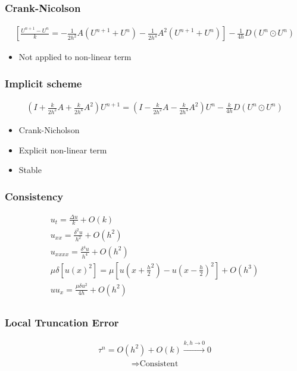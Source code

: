 \documentclass[screen]{beamer}
\begin{document}
\begin{frame}
\frametitle{Crank-Nicolson}
\small
\begin{align*}
 \left[\frac{U^{n+1} - U^n}{k} =
- \frac{1}{2h^2}A(U^{n+1}+U^n) - \frac{1}{2h^4}A^2(U^{n+1}+U^n) \right] - \frac{1}{4h}D(U^{n}\odot U^n)
\end{align*}
\begin{itemize}
\normalsize
\item Not applied to non-linear term
\end{itemize}
\end{frame}


\begin{frame}
\frametitle{Implicit scheme}
\begin{align*}
(I + \frac{k}{2h^2}A + \frac{k}{2h^4}A^2)U^{n+1}
= (I - \frac{k}{2h^2}A - \frac{k}{2h^4}A^2)U^n - \frac{k}{4h}D(U^{n}\odot U^n)
\end{align*}

\begin{itemize}
\item Crank-Nicholson
\item Explicit non-linear term
\item Stable
\end{itemize}

\end{frame}

\begin{frame}
\frametitle{Consistency}
\begin{align*}
u_t= \frac{\Delta u}{k} + O(k) \\
u_{xx} = \frac{\delta^2 u}{h^2} + O(h^2) \\
u_{xxxx} = \frac{\delta^4 u}{h^4} + O(h^2) \\
\mu \delta \left[u(x)^2\right] = \mu\left[u(x+\frac{h}{2}^2) - u(x - \frac{h}{2})^2\right] 
+ O(h^3) \\
uu_{x} = \frac{\mu \delta u^2}{4h} + O(h^2) \\
\end{align*}

\end{frame}

\begin{frame}

\frametitle{Local Truncation Error}

\begin{align*}
\tau ^n = O(h^2) + O(k) \xrightarrow{k,h \to 0} 0
\end{align*}
\begin{align*}
\Rightarrow \textrm{Consistent}
\end{align*}

\end{frame}
\end{document}
